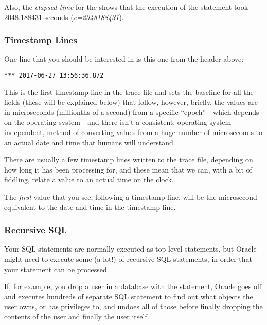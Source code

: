 Also, the \emph{elapsed time} for the  shows that the execution of the statement took 2048.188431 seconds (\emph{e=2048188431}).


\subsubsection{Timestamp Lines}\label{timestamp-lines}

One line that you should be interested in is this one from the header above:

\begin{lstlisting}[numbers=none,caption={Time Stamp Line}]
*** 2017-06-27 13:56:36.872
\end{lstlisting}

This is the first timestamp line in the trace file and sets the baseline for all the  fields (these will be explained below) that follow, however, briefly, the  values are in microseconds (millionths of a second) from a specific ``epoch'' - which depends on the operating system - and there isn't a consistent, operating system independent, method of converting  values from a huge number of microseconds to an actual date and time that humans will understand.

There are usually a few timestamp lines written to the trace file, depending on how long it has been processing for, and these mean that we can, with a bit of fiddling, relate a  value to an actual time on the clock.

The \emph{first}  value that you see, following a timestamp line, will be the microsecond equivalent to the date and time in the timestamp line.

\subsubsection{Recursive SQL}\label{recursive-sql}

Your SQL statements are normally executed as top-level statements, but Oracle might need to execute some (a lot!) of recursive SQL statements, in order that your statement can be processed. 

If, for example, you drop a user in a database with the  statement, Oracle goes off and executes hundreds of separate SQL statement to find out what objects the user owns, or has privileges to, and undoes all of those before finally dropping the contents of the user and finally the user itself.

